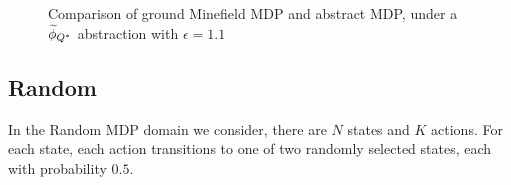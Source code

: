 \begin{figure}
\label{fig:minefield-visual}
\caption{Comparison of ground Minefield \ac{MDP} and abstract \ac{MDP}, under a $\widetilde \phi_{Q^*}$ abstraction with $\epsilon=1.1$}
\end{figure} 

\subsection{Random}

In the Random \ac{MDP} domain we consider, there are $N$ states and $K$ actions. For each state, each action transitions to one of two randomly selected states, each with probability $0.5$.


